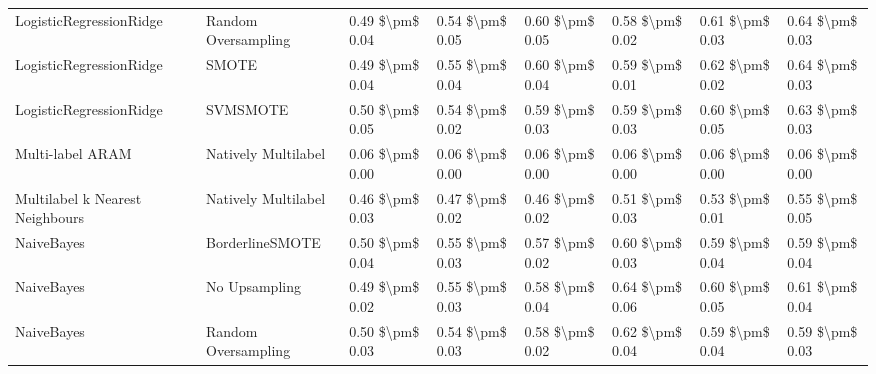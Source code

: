 \begin{tabular}{llllllll}
        LogisticRegressionRidge &           Random Oversampling & 0.49 \$\textbackslash pm\$ 0.04 &           0.54 \$\textbackslash pm\$ 0.05 &       0.60 \$\textbackslash pm\$ 0.05 &        0.58 \$\textbackslash pm\$ 0.02 &                         0.61 \$\textbackslash pm\$ 0.03 &     0.64 \$\textbackslash pm\$ 0.03 \\
        LogisticRegressionRidge &                         SMOTE & 0.49 \$\textbackslash pm\$ 0.04 &           0.55 \$\textbackslash pm\$ 0.04 &       0.60 \$\textbackslash pm\$ 0.04 &        0.59 \$\textbackslash pm\$ 0.01 &                         0.62 \$\textbackslash pm\$ 0.02 &     0.64 \$\textbackslash pm\$ 0.03 \\
        LogisticRegressionRidge &                      SVMSMOTE & 0.50 \$\textbackslash pm\$ 0.05 &           0.54 \$\textbackslash pm\$ 0.02 &       0.59 \$\textbackslash pm\$ 0.03 &        0.59 \$\textbackslash pm\$ 0.03 &                         0.60 \$\textbackslash pm\$ 0.05 &     0.63 \$\textbackslash pm\$ 0.03 \\
               Multi-label ARAM &           Natively Multilabel & 0.06 \$\textbackslash pm\$ 0.00 &           0.06 \$\textbackslash pm\$ 0.00 &       0.06 \$\textbackslash pm\$ 0.00 &        0.06 \$\textbackslash pm\$ 0.00 &                         0.06 \$\textbackslash pm\$ 0.00 &     0.06 \$\textbackslash pm\$ 0.00 \\
Multilabel k Nearest Neighbours &           Natively Multilabel & 0.46 \$\textbackslash pm\$ 0.03 &           0.47 \$\textbackslash pm\$ 0.02 &       0.46 \$\textbackslash pm\$ 0.02 &        0.51 \$\textbackslash pm\$ 0.03 &                         0.53 \$\textbackslash pm\$ 0.01 &     0.55 \$\textbackslash pm\$ 0.05 \\
                     NaiveBayes &               BorderlineSMOTE & 0.50 \$\textbackslash pm\$ 0.04 &           0.55 \$\textbackslash pm\$ 0.03 &       0.57 \$\textbackslash pm\$ 0.02 &        0.60 \$\textbackslash pm\$ 0.03 &                         0.59 \$\textbackslash pm\$ 0.04 &     0.59 \$\textbackslash pm\$ 0.04 \\
                     NaiveBayes &                 No Upsampling & 0.49 \$\textbackslash pm\$ 0.02 &           0.55 \$\textbackslash pm\$ 0.03 &       0.58 \$\textbackslash pm\$ 0.04 &        0.64 \$\textbackslash pm\$ 0.06 &                         0.60 \$\textbackslash pm\$ 0.05 &     0.61 \$\textbackslash pm\$ 0.04 \\
                     NaiveBayes &           Random Oversampling & 0.50 \$\textbackslash pm\$ 0.03 &           0.54 \$\textbackslash pm\$ 0.03 &       0.58 \$\textbackslash pm\$ 0.02 &        0.62 \$\textbackslash pm\$ 0.04 &                         0.59 \$\textbackslash pm\$ 0.04 &     0.59 \$\textbackslash pm\$ 0.03 \\

\end{tabular}
